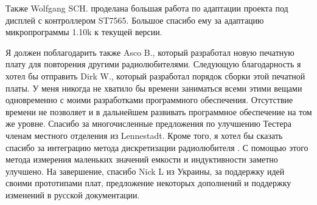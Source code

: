Также Wolfgang SCH. проделана большая работа по адаптации проекта под дисплей с контроллером ST7565. Большое спасибо ему
за адаптацию микропрограммы 1.10k к текущей версии.

Я должен поблагодарить также Asco B., который разработал новую печатную плату для повторения другими 
радиолюбителями. Следующую благодарность я хотел бы отправить Dirk W., который разработал порядок сборки этой печатной 
платы. У меня никогда не хватило бы времени заниматься всеми этими вещами одновременно с моими разработками 
программного обеспечения. Отсутствие времени не позволяет и в дальнейшем развивать программное обеспечение на том же 
уровне. Спасибо за многочисленные предложения по улучшению Тестера членам местного отделения 
 из Lennestadt.
Кроме того, я хотел бы сказать спасибо за интеграцию метода дискретизации радиолюбителя .
С помощью этого метода измерения маленьких значений емкости и индуктивности заметно улучшено.
На завершение, спасибо Nick L из Украины, за поддержку идей своими прототипами плат, предложение некоторых дополнений и
поддержку изменений в русской документации. 
